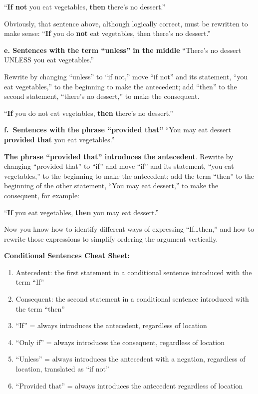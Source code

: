 \documentclass[
]{book}
\providecommand{\tightlist}{%
  \setlength{\itemsep}{0pt}\setlength{\parskip}{0pt}}
\begin{document}
``\textbf{If not} you eat vegetables, \textbf{then} there's no dessert.''

Obviously, that sentence above, although logically correct, must be rewritten to make sense:
``\textbf{If} you do \textbf{not} eat vegetables, then there's no dessert.''

\textbf{e. Sentences with the term ``unless'' in the middle}
``There's no dessert UNLESS you eat vegetables.''

Rewrite by changing ``unless'' to ``if not,'' move ``if not'' and its statement, ``you eat vegetables,'' to the beginning to make the antecedent; add ``then'' to the second statement, ``there's no dessert,'' to make the consequent.

``\textbf{If} you do not eat vegetables, \textbf{then} there's no dessert.''

\textbf{f.~Sentences with the phrase ``provided that''}
``You may eat dessert \textbf{provided that} you eat vegetables.''

\textbf{The phrase ``provided that'' introduces the antecedent}. Rewrite by changing ``provided that'' to ``if'' and move ``if'' and its statement, ``you eat vegetables,'' to the beginning to make the antecedent; add the term ``then'' to the beginning of the other statement, ``You may eat dessert,'' to make the consequent, for example:

``\textbf{If} you eat vegetables, \textbf{then} you may eat dessert.''

Now you know how to identify different ways of expressing ``If\ldots then,'' and how to rewrite those expressions to simplify ordering the argument vertically.

\textbf{Conditional Sentences Cheat Sheet:}

\begin{enumerate}
\def\labelenumi{\arabic{enumi}.}
\tightlist
\item
  Antecedent: the first statement in a conditional sentence introduced with the term ``If''\\
\item
  Consequent: the second statement in a conditional sentence introduced with the term ``then''\\
\item
  ``If'' = always introduces the antecedent, regardless of location\\
\item
  ``Only if'' = always introduces the consequent, regardless of location\\
\item
  ``Unless'' = always introduces the antecedent with a negation, regardless of location, translated as ``if not''\\
\item
  ``Provided that'' = always introduces the antecedent regardless of location
\end{enumerate}
\end{document}
